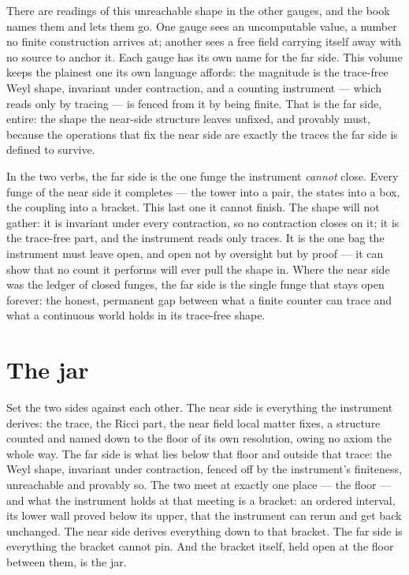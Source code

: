 There are readings of this unreachable shape in the other gauges, and the book names them and lets them go. One gauge sees an
uncomputable value, a number no finite construction arrives at; another sees a free field carrying itself away with no source
to anchor it. Each gauge has its own name for the far side. This volume keeps the plainest one its own language affords: the
magnitude is the trace-free Weyl shape, invariant under contraction, and a counting instrument --- which reads only by
tracing --- is fenced from it by being finite. That is the far side, entire: the shape the near-side structure leaves unfixed,
and provably must, because the operations that fix the near side are exactly the traces the far side is defined to survive.

In the two verbs, the far side is the one funge the instrument \emph{cannot} close. Every funge of the near side it completes
--- the tower into a pair, the states into a box, the coupling into a bracket. This last one it cannot finish. The shape will
not gather: it is invariant under every contraction, so no contraction closes on it; it is the trace-free part, and the
instrument reads only traces. It is the one bag the instrument must leave open, and open not by oversight but by proof --- it
can show that no count it performs will ever pull the shape in. Where the near side was the ledger of closed funges, the far
side is the single funge that stays open forever: the honest, permanent gap between what a finite counter can trace and what a
continuous world holds in its trace-free shape.

\section{The jar}

Set the two sides against each other. The near side is everything the instrument derives: the trace, the Ricci part, the near
field local matter fixes, a structure counted and named down to the floor of its own resolution, owing no axiom the whole
way. The far side is what lies below that floor and outside that trace: the Weyl shape, invariant under contraction, fenced
off by the instrument's finiteness, unreachable and provably so. The two meet at exactly one place --- the floor --- and what
the instrument holds at that meeting is a bracket: an ordered interval, its lower wall proved below its upper, that the
instrument can rerun and get back unchanged. The near side derives everything down to that bracket. The far side is everything
the bracket cannot pin. And the bracket itself, held open at the floor between them, is the jar.

